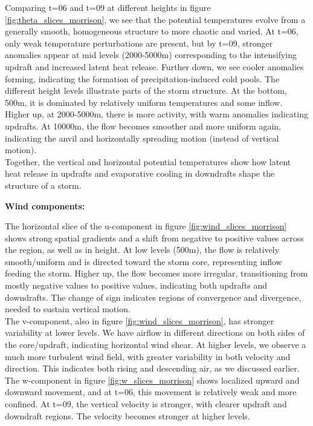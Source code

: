 \documentclass{article}
\begin{document}
Comparing t=06 and t=09 at different heights in figure \ref{fig:theta_slices_morrison}, we see that the potential temperatures evolve from a generally smooth, homogeneous structure to more chaotic and varied. At t=06, only weak temperature perturbations are present, but by t=09, stronger anomalies appear at mid levels (2000-5000m) corresponding to the intensifying updraft and increased latent heat release. Further down, we see cooler anomalies forming, indicating the formation of precipitation-induced cold pools. The different height levels illustrate parts of the storm structure. At the bottom, 500m, it is dominated by relatively uniform temperatures and some inflow. Higher up, at 2000-5000m, there is more activity, with warm anomalies indicating updrafts. At 10000m, the flow becomes smoother and more uniform again, indicating the anvil and horizontally spreading motion (instead of vertical motion). \\

Together, the vertical and horizontal potential temperatures show how latent heat release in updrafts and evaporative cooling in downdrafts shape the structure of a storm.

\textbf{Wind components:}

The horizontal slice of the u-component in figure \ref{fig:wind_slices_morrison} shows strong spatial gradients and a shift from negative to positive values across the region, as well as in height. At low levels (500m), the flow is relatively smooth/uniform and is directed toward the storm core, representing inflow feeding the storm. Higher up, the flow becomes more irregular, transitioning from mostly negative values to positive values, indicating both updrafts and downdrafts. The change of sign indicates regions of convergence and divergence, needed to sustain vertical motion. \\

The v-component, also in figure \ref{fig:wind_slices_morrison}, has stronger variability at lower levels. We have airflow in different directions on both sides of the core/updraft, indicating horizontal wind shear. At higher levels, we observe a much more turbulent wind field, with greater variability in both velocity and direction. This indicates both rising and descending air, as we discussed earlier. \\

The w-component in figure \ref{fig:w_slices_morrison} shows localized upward and downward movement, and at t=06, this movement is relatively weak and more confined. At t=09, the vertical velocity is stronger, with clearer updraft and downdraft regions. The velocity becomes stronger at higher levels. 
\end{document}
